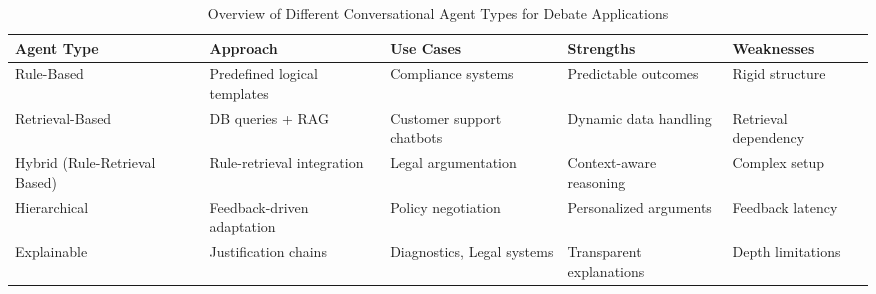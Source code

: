 \documentclass[conference]{IEEEtran}
\begin{document}
\begin{table}[ht]
    \centering
    \caption{Overview of Different Conversational Agent Types for Debate Applications}
    \label{tab:agents}
\begin{adjustbox}{width=\columnwidth,center}    
    \begin{tabular}{|>{\centering\arraybackslash}p{1.2cm}|>{\centering\arraybackslash}p{1.5cm}|>{\centering\arraybackslash}p{1.6cm}|>{\centering\arraybackslash}p{1.3cm}|>{\centering\arraybackslash}p{1.3cm}|}
    \hline
    \textbf{Agent Type}   & \textbf{Approach}                    & \textbf{Use Cases}                   & \textbf{Strengths}         & \textbf{Weaknesses}        \\ \hline
    Rule-Based           & Predefined logical templates                  & Compliance systems \cite{montealto2021rulebased}        & Predictable outcomes       & Rigid structure            \\ \hline
    Retrieval-Based      & DB queries + RAG                      & Customer support chatbots \cite{rakshit2019debbie}  & Dynamic data handling      & Retrieval dependency       \\ \hline
    Hybrid (Rule-Retrieval Based)               & Rule-retrieval integration            & Legal argumentation \cite{kulatska2019arguebot}        & Context-aware reasoning    & Complex setup              \\ \hline
    Hierarchical         & Feedback-driven adaptation \cite{sakai2020hierarchical}  & Policy negotiation                   & Personalized arguments     & Feedback latency           \\ \hline
    Explainable          & Justification chains \cite{ali2022supportattack}       & Diagnostics, Legal systems           & Transparent explanations   & Depth limitations          \\ \hline
    \end{tabular}
\end{adjustbox}
\end{table}

\footnotetext[1]{\label{galileobenchmark}\galileobenchmark}
\footnotetext[2]{\label{ibmaiagenteval}\ibmaiagenteval}
\footnotetext[3]{\label{superannotateevaluation}\superannotateevaluation}
\footnotetext[4]{\label{smythosperformance}\smythosperformance}
\end{document}
